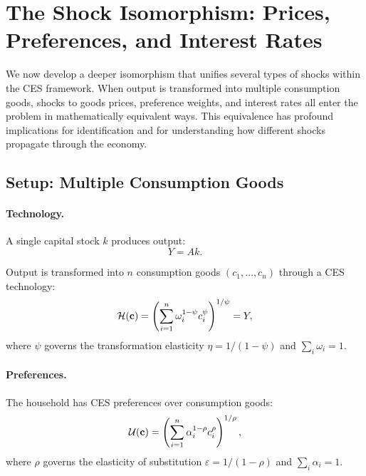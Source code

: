 \section{The Shock Isomorphism: Prices, Preferences, and Interest Rates}
\label{sec:ac-isomorphism}

We now develop a deeper isomorphism that unifies several types of shocks within the CES framework. When output is transformed into multiple consumption goods, shocks to goods prices, preference weights, and interest rates all enter the problem in mathematically equivalent ways. This equivalence has profound implications for identification and for understanding how different shocks propagate through the economy.

\subsection{Setup: Multiple Consumption Goods}
\label{subsec:ac-iso-setup}

\paragraph{Technology.}
A single capital stock $k$ produces output:
\begin{equation}
Y = A k.
\label{eq:ac-iso-production}
\end{equation}

Output is transformed into $n$ consumption goods $(c_1, \ldots, c_n)$ through a CES technology:
\begin{equation}
\mathcal{H}(\mathbf{c}) = \left( \sum_{i=1}^{n} \omega_i^{1-\psi} c_i^{\psi} \right)^{1/\psi} = Y,
\label{eq:ac-iso-transformation}
\end{equation}
where $\psi$ governs the transformation elasticity $\eta = 1/(1-\psi)$ and $\sum_i \omega_i = 1$.

\paragraph{Preferences.}
The household has CES preferences over consumption goods:
\begin{equation}
\mathcal{U}(\mathbf{c}) = \left( \sum_{i=1}^{n} \alpha_i^{1-\rho} c_i^{\rho} \right)^{1/\rho},
\label{eq:ac-iso-utility}
\end{equation}
where $\rho$ governs the elasticity of substitution $\varepsilon = 1/(1-\rho)$ and $\sum_i \alpha_i = 1$.

